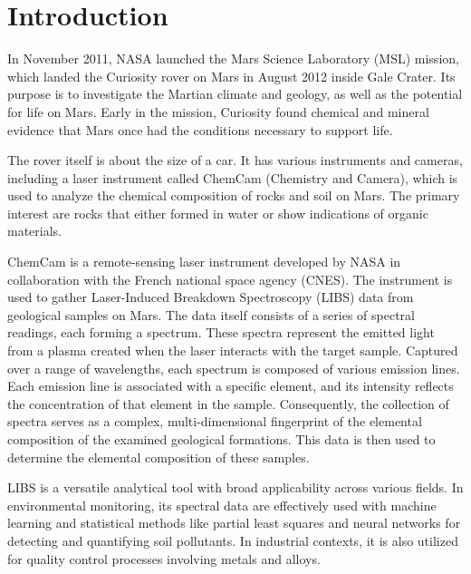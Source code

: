 \section{Introduction}\label{sec:introduction}
In November 2011, NASA launched the Mars Science Laboratory (MSL) mission, which landed the Curiosity rover on Mars in August 2012 inside Gale Crater. Its purpose is to investigate the Martian climate and geology, as well as the potential for life on Mars.
Early in the mission, Curiosity found chemical and mineral evidence that Mars once had the conditions necessary to support life.\cite{chemcamNasaWebsite}

The rover itself is about the size of a car.
It has various instruments and cameras, including a laser instrument called ChemCam (Chemistry and Camera), which is used to analyze the chemical composition of rocks and soil on Mars.
The primary interest are rocks that either formed in water or show indications of organic materials.\cite{chemcamNasaWebsite}

ChemCam is a remote-sensing laser instrument developed by NASA in collaboration with the French national space agency (CNES).
The instrument is used to gather Laser-Induced Breakdown Spectroscopy (LIBS) data from geological samples on Mars. The data itself consists of a series of spectral readings, each forming a spectrum. These spectra represent the emitted light from a plasma created when the laser interacts with the target sample. Captured over a range of wavelengths, each spectrum is composed of various emission lines. Each emission line is associated with a specific element, and its intensity reflects the concentration of that element in the sample. Consequently, the collection of spectra serves as a complex, multi-dimensional fingerprint of the elemental composition of the examined geological formations.
This data is then used to determine the elemental composition of these samples.\cite{cleggRecalibrationMarsScience2017}

LIBS is a versatile analytical tool with broad applicability across various fields. In environmental monitoring, its spectral data are effectively used with machine learning and statistical methods like partial least squares and neural networks for detecting and quantifying soil pollutants. In industrial contexts, it is also utilized for quality control processes involving metals and alloys\cite{huang_progress_2023}.

